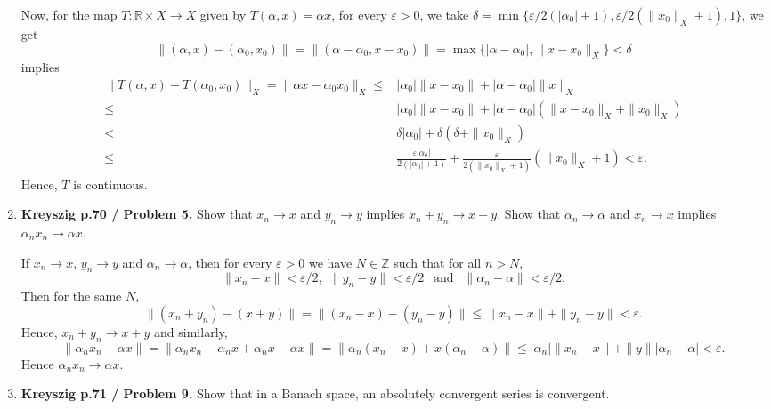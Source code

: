 \documentclass[12pt]{article}
\newcommand{\rl}{\mathbb{R}}
\begin{document}
\begin{enumerate}
\begin{mybox}
    \vspace*{3mm}
    Now, for the map $T:\rl\times X\to X$ given by
    $T(\alpha, x)=\alpha x$, for every $\varepsilon>0$,
    we take $\delta=\min\{\varepsilon/2(|\alpha_0|+1),
    \varepsilon/2(\|x_0\|_X+1), 1\}$, we get
    $$\|(\alpha,x)-(\alpha_0,x_0)\|=
    \|(\alpha-\alpha_0,x-x_0)\|=
    \max\{|\alpha-\alpha_0|, \|x-x_0\|_X\}<\delta$$
    implies
    \begin{align*}
        \|T(\alpha,x)-T(\alpha_0,x_0)\|_X=
    \|\alpha x-\alpha_0x_0\|_X\leq &|\alpha_0|\|x-x_0\|+
    |\alpha-\alpha_0|\|x\|_X\\
    \leq&|\alpha_0|\|x-x_0\|+|\alpha-\alpha_0|(\|x-x_0\|_X
    +\|x_0\|_X)\\
    <&\delta|\alpha_0|+\delta(\delta + \|x_0\|_X)\\
    \leq&\frac{\varepsilon|\alpha_0|}{2(|\alpha_0|+1)}+
    \frac{\varepsilon}{2(\|x_0\|_X+1)}(\|x_0\|_X+1)
    <\varepsilon.
    \end{align*}
    Hence, $T$ is continuous.
\end{mybox}


\item \textbf{Kreyszig p.70 / Problem 5.}
    Show that $x_n \to x$ and $y_n \to y$ implies
    $x_n + y_n \to x + y$. Show that $\alpha_n \to \alpha$
    and $x_n \to x$ implies $\alpha_n x_n \to \alpha x$.
\begin{mybox}

    If $x_n \to x$, $y_n \to y$ and $\alpha_n\to\alpha$,
    then for every
    $\varepsilon>0$ we have $N\in \mathbb{Z}$
    such that for all $n>N$,
    $$\|x_n-x\|<\varepsilon/2, \ \
    \|y_n-y\|<\varepsilon/2\ \ \text{ and }
    \ \ \|\alpha_n-\alpha\|<\varepsilon/2.$$
    Then for the same $N$, $$\|(x_n+y_n)-(x+y)\|=
    \|(x_n-x)-(y_n-y)\|\leq\|x_n-x\|+\|y_n-y\|<\varepsilon.
    $$
    Hence, $x_n+y_n \to x+y$ and similarly,
    $$\|\alpha_n x_n-\alpha x\|=
    \|\alpha_n x_n-\alpha_n x +\alpha_n x-\alpha x\|=
    \|\alpha_n(x_n-x) +x(\alpha_n-\alpha)\|
    \leq|\alpha_n|\|x_n-x\|+\|y\||\alpha_n-\alpha|<\varepsilon.
    $$
    Hence $\alpha_n x_n\to\alpha x$.
\end{mybox}

 
\item \textbf{Kreyszig p.71 / Problem 9.}
    Show that in a Banach space, an absolutely
    convergent series is convergent.
\begin{mybox}


\end{mybox}
\end{enumerate}
\end{document}
